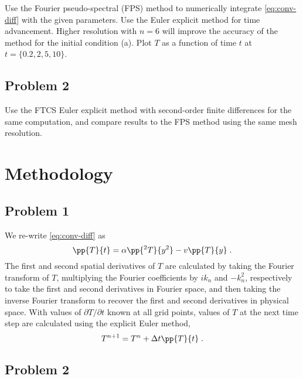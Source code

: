 \documentclass[11pt]{article}
\begin{document}
Use the Fourier pseudo-spectral (FPS) method to numerically integrate \eqref{eq:conv-diff} with the given parameters. Use the Euler explicit method for time advancement. Higher resolution with $n=6$ will improve the accuracy of the method for the initial condition (a). Plot $T$ as a function of time $t$ at $t = \{0.2, 2, 5, 10\}$.

\subsection{Problem 2}

Use the FTCS Euler explicit method with second-order finite differences for the same computation, and compare results to the FPS method using the same mesh resolution.

\section{Methodology} %

\subsection{Problem 1}

We re-write \eqref{eq:conv-diff} as
\begin{equation}
\pp{T}{t} = \alpha \pp{^2T}{y^2} - v \pp{T}{y}
\;.
\end{equation}
The first and second spatial derivatives of $T$ are calculated by taking the Fourier transform of $T$, multiplying the Fourier coefficients by $i k_n$ and $-k_n^2$, respectively to take the first and second derivatives in Fourier space, and then taking the inverse Fourier transform to recover the first and second derivatives in physical space. With values of $\partial T / \partial t$ known at all grid points, values of $T$ at the next time step are calculated using the explicit Euler method,
\begin{equation}
T^{n+1} = T^n + \Delta t \pp{T}{t}
\;.
\end{equation}

\subsection{Problem 2}
\end{document}
